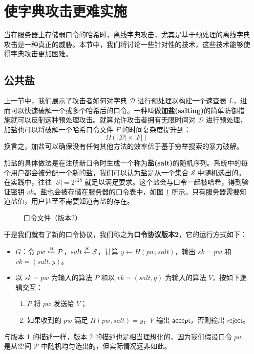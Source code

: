\section{使字典攻击更难实施}

当在服务器上存储弱口令的哈希时，离线字典攻击，尤其是基于预处理的离线字典攻击是一种真正的威胁。本节中，我们将讨论一些针对性的技术，这些技术能够使得字典攻击更加困难。

\subsection{公共盐}

上一节中，我们展示了攻击者如何对字典 $\mathcal{D}$ 进行预处理以构建一个速查表 $L$，进而可以快速破解一个或多个哈希后的口令。一种叫做\textbf{加盐(salting)}的简单防御措施就可以反制这种预处理攻击。就算允许攻击者拥有无限时间对 $\mathcal{D}$ 进行预处理，加盐也可以将破解一个哈希口令文件 $F$ 的时间复杂度提升到：
\[
\Omega(|\mathcal{D}|\times |F|)
\]
换言之，加盐可以确保没有任何其他方法的效率优于基于穷举搜索的暴力破解。

加盐的具体做法是在注册新口令时生成一个称为\textbf{盐(salt)}的随机序列。系统中的每个用户都会被分配一个新的盐，我们可以认为盐是从一个集合 $\mathcal{S}$ 中随机选出的。在实践中，往往 $|\mathcal{S}|=2^{128}$ 就足以满足要求。这个盐会与口令一起被哈希，得到验证密钥 $vk$。盐也会被存储在服务器的口令表中，如图 \ref{fig:18-4} 所示。只有服务器需要知道盐值，用户甚至不需要知道有盐的存在。

\begin{figure}
  \centering
  
  \caption{口令文件（版本2）}
  \label{fig:18-4}
\end{figure}

于是我们就有了新的口令协议，我们称之为\textbf{口令协议版本2}，它的运行方式如下：
\begin{itemize}
	\item $G$：令 $pw \xleftarrow{\rm R}\mathcal{P}$，$salt\overset{\rm R}\leftarrow\mathcal{S}$，计算 $y\leftarrow H(pw,salt)$，输出 $sk=pw$ 和 $vk=(salt,y)$。
	\item 以 $sk=pw$ 为输入的算法 $P$ 和以 $vk=(salt,y)$ 为输入的算法 $V$，按如下逻辑交互：
	\begin{enumerate}
		\item $P$ 将 $pw$ 发送给 $V$；
		\item 如果收到的 $pw$ 满足 $H(pw,salt)=y$，$V$ 输出 $\mathsf{accept}$，否则输出 $\mathsf{reject}$。
	\end{enumerate}
\end{itemize}
与版本 1 的描述一样，版本 2 的描述也是相当理想化的，因为我们假设口令 $pw$ 是从空间 $\mathcal{P}$ 中随机均匀选出的，但实际情况远非如此。

